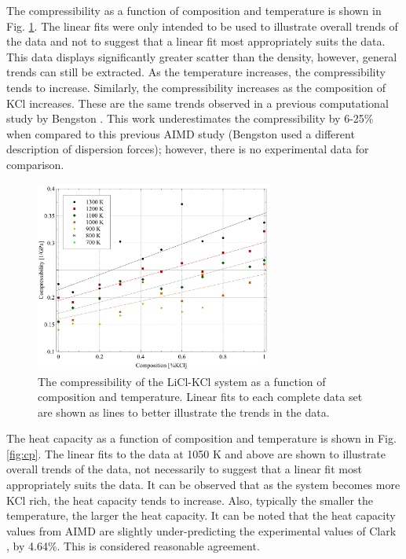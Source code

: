 \documentclass[review]{elsarticle}
\begin{document}
\FloatBarrier

The compressibility as a function of composition and temperature is shown in Fig. \ref{fig:compressibility}. The linear fits were only intended to be used to illustrate overall trends of the data and not to suggest that a linear fit most appropriately suits the data. This data displays significantly greater scatter than the density, however, general trends can still be extracted. As the temperature increases, the compressibility tends to increase. Similarly, the compressibility increases as the composition of KCl increases. These are the same trends observed in a previous computational study by Bengston \cite{Bengston2014}. This work underestimates the compressibility by 6-25\% when compared to this previous AIMD study (Bengston used a different description of dispersion forces); however, there is no experimental data for comparison.

\begin{figure}[h]
 \centering
 \includegraphics[width=0.7\textwidth]{images/compressibility.jpg} 
 \caption{The compressibility of the LiCl-KCl system as a function of composition and temperature. Linear fits to each complete data set are shown as lines to better illustrate the trends in the data. }
 \label{fig:compressibility}
\end{figure} 

The heat capacity as a function of composition and temperature is shown in Fig. \ref{fig:cp}. The linear fits to the data at 1050 K and above are shown to illustrate overall trends of the data, not necessarily to suggest that a linear fit most appropriately suits the data. It can be observed that as the system becomes more KCl rich, the heat capacity tends to increase. Also, typically the smaller the temperature, the larger the heat capacity. It can be noted that the heat capacity values from AIMD are slightly under-predicting the experimental values of Clark \cite{clark1973}, by 4.64\%. This is considered reasonable agreement.
\end{document}
